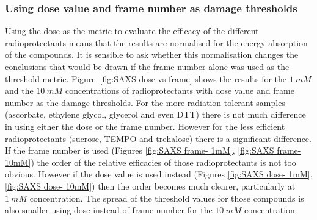 \subsubsection{Using dose value and frame number as damage thresholds}
\label{subs:Using dose value and frame number as damage thresholds}
Using the dose as the metric to evaluate the efficacy of the different radioprotectants means that the results are normalised for the energy absorption of the compounds. It is sensible to ask whether this normalisation changes the conclusions that would be drawn if the frame number alone was used as the threshold metric.
Figure~\ref{fig:SAXS dose vs frame} shows the results for the $1\ mM$ and the $10\ mM$ concentrations of radioprotectants with dose value and frame number as the damage thresholds.
For the more radiation tolerant samples (ascorbate, ethylene glycol, glycerol and even DTT) there is not much difference in using either the dose or the frame number.
However for the less efficient radioprotectants (sucrose, TEMPO and trehalose) there is a significant difference.
If the frame number is used (Figures \ref{fig:SAXS frame- 1mM}, \ref{fig:SAXS frame- 10mM}) the order of the relative efficacies of those radioprotectants is not too obvious.
However if the dose value is used instead (Figures \ref{fig:SAXS dose- 1mM}, \ref{fig:SAXS dose- 10mM}) then the order becomes much clearer, particularly at $1\ mM$ concentration.
The spread of the threshold values for those compounds is also smaller using dose instead of frame number for the $10\ mM$ concentration.
